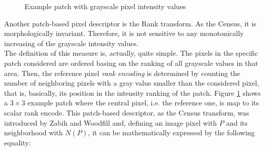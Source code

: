\begin{figure}[t]
	\centering
\caption{Example patch with grayscale pixel intensity values}
\label{fig:rank-example}
\end{figure}

Another patch-based pixel descriptor is the Rank transform.
As the Census, it is morphologically invariant.
Therefore, it is not sensitive to any monotonically increasing of the grayscale intensity values. \\
The definition of this measure is, actually, quite simple.
The pixels in the specific patch considered are ordered basing on the ranking of all grayscale values in that area. 
Then, the reference pixel \textit{rank encoding} is determined by counting the number of neighboring pixels with a gray value smaller than the considered pixel, that is, basically, its position in the intensity ranking of the patch.
Figure \ref{fig:rank-example} shows a $3 \times 3$ example patch where the central pixel, i.e. the reference one, is map to its scalar rank encode. 
This patch-based descriptor, as the Census transform, was introduced by Zabih and Woodfill \cite{Zabih1994} and, defining an image pixel with $P$ and its neighborhood with $N(P)$, it can be mathematically expressed by the following equality:

